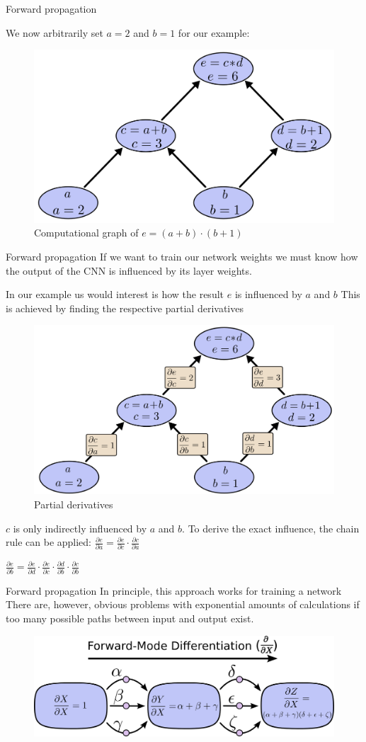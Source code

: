 \documentclass[12pt]{beamer}
\begin{document}
\begin{frame}{Forward propagation}

We now arbitrarily set $a = 2$ and $b = 1$ for our example:

\begin{figure}
\centering
\includegraphics[width = 0.4\linewidth]{images/backprop2.png}
\caption{Computational graph of $e = (a+b)\cdot (b+1)$}

\label{fig:propagation}
\end{figure}
\end{frame}
\begin{frame}{Forward propagation}
If we want to train our network weights we must know how the output of the CNN is influenced by its layer weights.

In our example us would interest is how the result $e$ is influenced by $a$ and $b$
This is achieved by finding the respective partial derivatives
\begin{figure}
\centering
\includegraphics[width = 0.4\linewidth]{images/backprop3.png}
\caption{Partial derivatives}

\label{fig:propagation}
\end{figure}
$c$ is only indirectly influenced by $a$ and $b$. To derive the exact influence, the chain rule can be applied:
$\frac{\partial{e}}{\partial{a}} = \frac{\partial{e}}{\partial{c}} \cdot \frac{\partial{c}}{\partial{a}}$

$\frac{\partial{e}}{\partial{b}} = \frac{\partial{e}}{\partial{d}} \cdot \frac{\partial{e}}{\partial{c}} \cdot \frac{\partial{d}}{\partial{b}} \cdot \frac{\partial{c}}{\partial{b}}$

\end{frame}
\begin{frame}{Forward propagation}
In principle, this approach works for training a network
There are, however, obvious problems with exponential amounts of calculations if too many possible paths between input and output exist.
\begin{figure}
\centering
\includegraphics[width = 0.4\linewidth]{images/backprop5.png}
\label{fig:propagation5}
\end{figure}
\end{frame}
\end{document}
